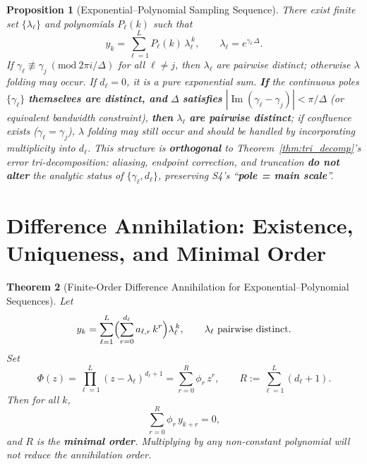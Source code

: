 \documentclass[11pt,a4paper]{article}
\newtheorem{theorem}{Theorem}[section]
\newtheorem{proposition}[theorem]{Proposition}
\theoremstyle{remark}
\DeclareMathOperator{\Im}{Im}
\begin{document}
\begin{proposition}[Exponential--Polynomial Sampling Sequence]\label{prop:exp_poly_sample}
There exist finite set $\{\lambda_\ell\}$ and polynomials $P_\ell(k)$ such that
\begin{equation}
y_k=\sum_{\ell=1}^L P_\ell(k)\,\lambda_\ell^{\,k},\qquad
\lambda_\ell=e^{\gamma_\ell\,\Delta}.
\end{equation}
If $\gamma_\ell\not\equiv\gamma_j\ (\mathrm{mod}\ 2\pi i/\Delta)$ for all $\ell\ne j$, then $\lambda_\ell$ are pairwise distinct; otherwise $\lambda$ folding may occur. If $d_\ell=0$, it is a pure exponential sum. \textbf{If} the continuous poles $\{\gamma_\ell\}$ \textbf{themselves are distinct, and} $\Delta$ \textbf{satisfies} $|\Im(\gamma_\ell-\gamma_j)|<\pi/\Delta$ (or equivalent bandwidth constraint), \textbf{then} $\lambda_\ell$ \textbf{are pairwise distinct}; if confluence exists ($\gamma_\ell=\gamma_j$), $\lambda$ folding may still occur and should be handled by incorporating multiplicity into $d_\ell$. This structure is \textbf{orthogonal} to Theorem~\ref{thm:tri_decomp}'s error tri-decomposition: aliasing, endpoint correction, and truncation \textbf{do not alter} the analytic status of $\{\gamma_\ell,d_\ell\}$, preserving S4's ``\textbf{pole = main scale}''.
\end{proposition}

\section{Difference Annihilation: Existence, Uniqueness, and Minimal Order}

\begin{theorem}[Finite-Order Difference Annihilation for Exponential--Polynomial Sequences]\label{thm:annihilation}
Let
\begin{equation}
y_k=\sum_{\ell=1}^L\Bigl(\sum_{r=0}^{d_\ell} a_{\ell,r}\,k^r\Bigr)\lambda_\ell^{\,k},
\qquad \lambda_\ell\ \text{pairwise distinct}.
\end{equation}
Set
\begin{equation}
\Phi(z)=\prod_{\ell=1}^L (z-\lambda_\ell)^{d_\ell+1}
=\sum_{r=0}^{R}\phi_r\,z^r,\qquad
R:=\sum_{\ell=1}^L(d_\ell+1).
\end{equation}
Then for all $k$,
\begin{equation}
\sum_{r=0}^{R}\phi_r\,y_{k+r}=0,
\end{equation}
and $R$ is the \textbf{minimal order}. Multiplying by any non-constant polynomial will not reduce the annihilation order.
\end{theorem}
\end{document}
